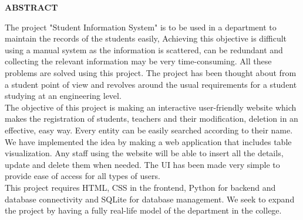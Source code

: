 \pagestyle{empty}
\begin{center}
\textup{\large{\textbf{ABSTRACT}}}
\end{center}

\justify
\indent
The project "Student Information System" is to be used in a department to maintain the records of the students easily, Achieving this objective is difficult using a manual system as the information is scattered, can be redundant and collecting the relevant information may be very time-consuming. All these problems are solved using this project. The project has been thought about from a student point of view and revolves around the usual requirements for a student studying at an engineering level. 
\\[10pt]

The objective of this project is making an interactive user-friendly website which makes the registration of students, teachers and their modification, deletion in an effective, easy way. Every entity can be easily searched according to their name. We have implemented the idea by making a web application that includes table visualization. Any staff using the website will be able to insert all the details, update and delete them when needed. The UI has been made very simple to provide ease of access for all types of users.
\\[10pt]

This project requires HTML, CSS in the frontend, Python for backend and database connectivity and SQLite for database management. We seek to expand the project by having a fully real-life model of the department in the college. 

\pagebreak
